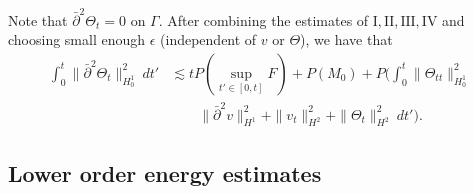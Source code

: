 \documentclass[12pt,a4paper]{amsart}
\numberwithin{equation}{section}
\theoremstyle{plain}
\theoremstyle{definition}
\newcommand{\bpartial}{\bar{\partial}}
\begin{document}
Note that $\bpartial^2 \Theta_t=0$ on $\Gamma$.
After combining the estimates of $\mathrm{I}, \mathrm{II}, \mathrm{III}, \mathrm{IV}$ 
and choosing small enough $\epsilon$ (independent of $v$ or $\Theta$), 
we have that
\begin{equation}\label{thetatxx}
\begin{aligned}
\int_{0}^{t}\|\bpartial^2 \Theta_t\|_{H_0^1}^2\ dt'
&\lesssim tP(\sup\limits_{t'\in[0,t]}F)+P(M_0)+P \Big(\int_{0}^{t}\|\Theta_{tt}\|_{H_0^1}^2\\
&\qquad \|\bpartial^2 v\|_{H^1}^2+\|v_t\|_{H^2}^2+\|\Theta_t\|_{H^2}^2 \ dt'\Big).
\end{aligned}
\end{equation}

\vspace{0.3cm}

\subsection{Lower order energy estimates}~
\vspace{0.3cm}
\end{document}
